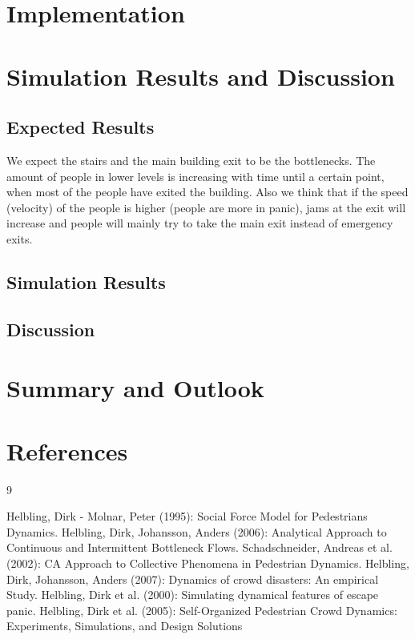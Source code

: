 \documentclass[11pt]{article}
\begin{document}
\section{Implementation}

\section{Simulation Results and Discussion}

\subsection{Expected Results}

We expect the stairs and the main building exit to be the bottlenecks. The amount of people in lower levels is increasing with time until a certain point, when most of the people have exited the building. Also we think that if the speed (velocity) of the people is higher (people are more in panic), jams at the exit will increase and people will mainly try to take the main exit instead of emergency exits.

\subsection{Simulation Results}

\subsection{Discussion}


\section{Summary and Outlook}

\section{References}

\begin{thebibliography} {9}
	
	 Helbling, Dirk - Molnar, Peter (1995): Social Force Model for Pedestrians Dynamics.
	 Helbling, Dirk, Johansson, Anders (2006): Analytical Approach to Continuous and Intermittent Bottleneck Flows.
	 Schadschneider, Andreas et al. (2002): CA Approach to Collective Phenomena in Pedestrian Dynamics.	
	 Helbling, Dirk, Johansson, Anders (2007): Dynamics of crowd disasters: An empirical Study.
	 Helbling, Dirk et al. (2000): Simulating dynamical features of escape panic.
	 Helbling, Dirk et al. (2005): Self-Organized Pedestrian Crowd Dynamics: Experiments, Simulations, and Design Solutions

\end{thebibliography}
\end{document}

